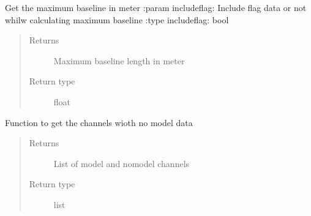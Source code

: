 \documentclass[letterpaper,10pt,english]{sphinxmanual}
\begin{document}
\begin{fulllineitems}
\begin{fulllineitems}
\begin{quote}
\begin{description}
\end{description}\end{quote}

\end{fulllineitems}


\begin{fulllineitems}
\label{\detokenize{paircars:paircars.access_ms.AccessMS.get_max_baseline}}
\sphinxAtStartPar
Get the maximum baseline in meter
:param includeflag: Include flag data or not whilw calculating maximum baseline
:type includeflag: bool
\begin{quote}\begin{description}
\item[{Returns}] \leavevmode
\sphinxAtStartPar
Maximum baseline length in meter

\item[{Return type}] \leavevmode
\sphinxAtStartPar
float

\end{description}\end{quote}

\end{fulllineitems}


\begin{fulllineitems}
\label{\detokenize{paircars:paircars.access_ms.AccessMS.get_model_nomodel_chan}}
\sphinxAtStartPar
Function to get the channels wioth no model data
\begin{quote}\begin{description}
\item[{Returns}] \leavevmode
\sphinxAtStartPar
List of model and nomodel channels

\item[{Return type}] \leavevmode
\sphinxAtStartPar
list

\end{description}\end{quote}


\end{fulllineitems}
\end{fulllineitems}
\end{document}
